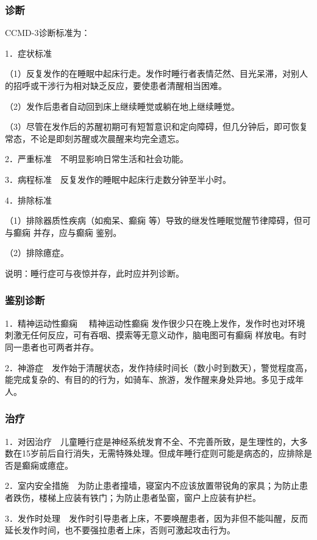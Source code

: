\subsubsection{诊断}

CCMD-3诊断标准为：

1．症状标准

（1）反复发作的在睡眠中起床行走。发作时睡行者表情茫然、目光呆滞，对别人的招呼或干涉行为相对缺乏反应，要使患者清醒相当困难。

（2）发作后患者自动回到床上继续睡觉或躺在地上继续睡觉。

（3）尽管在发作后的苏醒初期可有短暂意识和定向障碍，但几分钟后，即可恢复常态，不论是即刻苏醒或次晨醒来均完全遗忘。

2．严重标准　不明显影响日常生活和社会功能。

3．病程标准　反复发作的睡眠中起床行走数分钟至半小时。

4．排除标准

（1）排除器质性疾病（如痴呆、癫痫
等）导致的继发性睡眠觉醒节律障碍，但可与癫痫
并存，应与癫痫 鉴别。

（2）排除癔症。

说明：睡行症可与夜惊并存，此时应并列诊断。

\subsubsection{鉴别诊断}

1．精神运动性癫痫
　精神运动性癫痫
发作很少只在晚上发作，发作时也对环境刺激无任何反应，可有吞咽、摸索等无意义动作，脑电图可有癫痫
样放电。有时同一患者也可两者并存。

2．神游症　发作始于清醒状态，发作持续时间长（数小时到数天），警觉程度高，能完成复杂的、有目的的行为，如骑车、旅游，发作醒来身处异地。多见于成年人。

\subsubsection{治疗}

1．对因治疗　儿童睡行症是神经系统发育不全、不完善所致，是生理性的，大多数在15岁前后自行消失，无需特殊处理。但成年睡行症则可能是病态的，应排除是否是癫痫或癔症。

2．室内安全措施　为防止患者撞墙，寝室内不应该放置带锐角的家具；为防止患者跌伤，楼梯上应装有铁门；为防止患者坠窗，窗户上应装有护栏。

3．发作时处理　发作时引导患者上床，不要唤醒患者，因为非但不能叫醒，反而延长发作时间，也不要强拉患者上床，否则可激起攻击行为。

